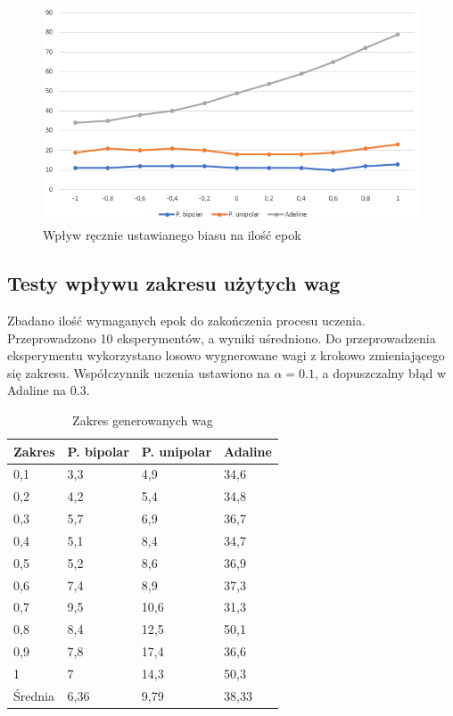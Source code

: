 \documentclass{article}
\begin{document}
\begin{figure}[h]
  \centering
  \includegraphics[width=\linewidth]{manualbias.png}
  \caption{Wpływ ręcznie ustawianego biasu na ilość epok}
\end{figure}

\newpage
\subsection{ Testy wpływu zakresu użytych wag }

Zbadano ilość wymaganych epok do zakończenia procesu uczenia. Przeprowadzono 10 eksperymentów, a wyniki uśredniono.
Do przeprowadzenia eksperymentu wykorzystano losowo wygnerowane wagi z krokowo zmieniającego się zakresu.
Współczynnik uczenia ustawiono na $\alpha = 0.1$, a dopuszczalny błąd w Adaline na $0.3$.

\begin{table}[h]
  \centering
    
  \bgroup
  \def\arraystretch{1.3}
  \begin{tabular}{|l|l|l|l|}
  \hline
  Zakres & P. bipolar & P. unipolar & Adaline  \\ \hline
  0,1 & 3,3 & 4,9 & 34,6 \\ \hline
  0,2 & 4,2 & 5,4 & 34,8 \\ \hline
  0,3 & 5,7 & 6,9 & 36,7 \\ \hline
  0,4 & 5,1 & 8,4 & 34,7 \\ \hline
  0,5 & 5,2 & 8,6 & 36,9 \\ \hline
  0,6 & 7,4 & 8,9 & 37,3 \\ \hline
  0,7 & 9,5 & 10,6 & 31,3 \\ \hline
  0,8 & 8,4 & 12,5 & 50,1 \\ \hline
  0,9 & 7,8 & 17,4 & 36,6 \\ \hline
  1 & 7 & 14,3 & 50,3 \\ \hline
  Średnia & 6,36 & 9,79 & 38,33 \\ \hline
  \end{tabular}
  \egroup
  \vspace{10px}
  \caption{Zakres generowanych wag}
\end{table}
\end{document}

